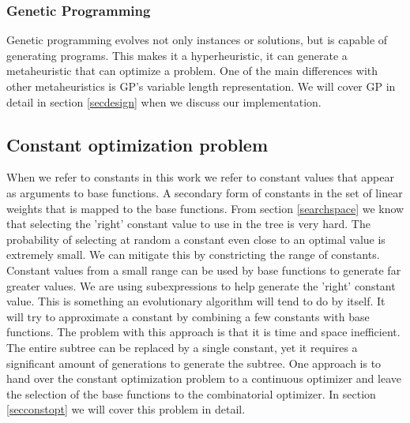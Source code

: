 \subsubsection{Genetic Programming}
Genetic programming \cite{GP} evolves not only instances or solutions, but is capable of generating programs. This makes it a hyperheuristic, it can generate a metaheuristic that can optimize a problem. One of the main differences with other metaheuristics is GP's variable length representation. 
We will cover GP in detail in section \ref{secdesign}  when we discuss our implementation.

\subsection{Constant optimization problem}
When we refer to constants in this work we refer to constant values that appear as arguments to base functions. A secondary form of constants in the set of linear weights that is mapped to the base functions. 
From section \ref{searchspace} we know that selecting the 'right' constant value to use in the tree is very hard. The probability of selecting at random a constant even close to an optimal value is extremely small. We can mitigate this by constricting the range of constants. Constant values from a small range can be used by base functions to generate far greater values. We are using subexpressions to help generate the 'right' constant value. This is something an evolutionary algorithm will tend to do by itself. It will try to approximate a constant by combining a few constants with base functions. The problem with this approach is that it is time and space inefficient. The entire subtree can be replaced by a single constant, yet it requires a significant amount of generations to generate the subtree. One approach is to hand over the constant optimization problem to a continuous optimizer and leave the selection of the base functions to the combinatorial optimizer. In section \ref{secconstopt} we will cover this problem in detail.

